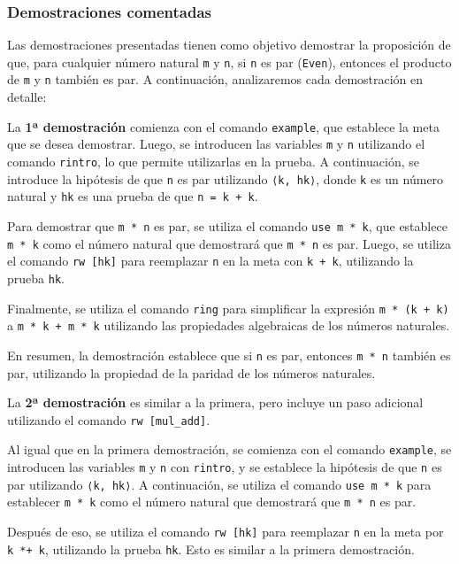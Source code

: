 \subsubsection*{Demostraciones comentadas}

Las demostraciones presentadas tienen como objetivo demostrar la
proposición de que, para cualquier número natural \texttt{m} y \texttt{n}, si \texttt{n} es par
(\texttt{Even}), entonces el producto de \texttt{m} y \texttt{n} también es par. A continuación,
analizaremos cada demostración en detalle:

La \textbf{1ª demostración} comienza con el comando \texttt{example}, que establece la
meta que se desea demostrar. Luego, se introducen las variables \texttt{m} y
\texttt{n} utilizando el comando \texttt{rintro}, lo que permite utilizarlas en la
prueba. A continuación, se introduce la hipótesis de que \texttt{n} es par
utilizando \texttt{⟨k, hk⟩}, donde \texttt{k} es un número natural y \texttt{hk} es una
prueba de que \texttt{n = k + k}.

Para demostrar que \texttt{m * n} es par, se utiliza el comando \texttt{use m * k},
que establece \texttt{m * k} como el número natural que demostrará que \texttt{m * n}
es par. Luego, se utiliza el comando \texttt{rw [hk]} para reemplazar \texttt{n} en la
meta con \texttt{k + k}, utilizando la prueba \texttt{hk}.

Finalmente, se utiliza el comando \texttt{ring} para simplificar la expresión
\texttt{m * (k + k)} a \texttt{m * k + m * k} utilizando las propiedades algebraicas
de los números naturales.

En resumen, la demostración establece que si \texttt{n} es par, entonces
\texttt{m * n} también es par, utilizando la propiedad de la paridad de los números
naturales.

La \textbf{2ª demostración} es similar a la primera, pero incluye un paso
adicional utilizando el comando \texttt{rw [mul\_add]}.

Al igual que en la primera demostración, se comienza con el comando
\texttt{example}, se introducen las variables \texttt{m} y \texttt{n} con \texttt{rintro}, y se
establece la hipótesis de que \texttt{n} es par utilizando \texttt{⟨k, hk⟩}. A
continuación, se utiliza el comando \texttt{use m * k} para establecer \texttt{m * k}
como el número natural que demostrará que \texttt{m * n} es par.

Después de eso, se utiliza el comando \texttt{rw [hk]} para reemplazar \texttt{n} en
la meta por \texttt{k *+ k}, utilizando la prueba \texttt{hk}. Esto es similar a la
primera demostración.

